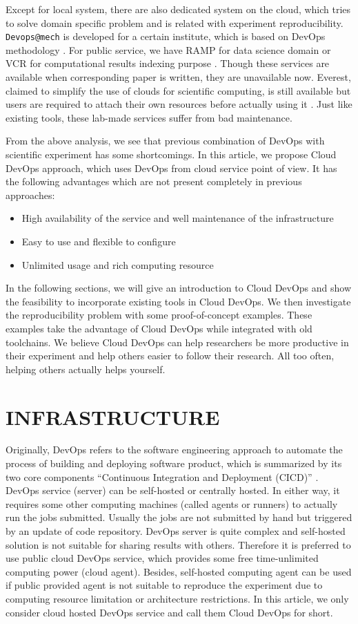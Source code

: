 \documentclass[10pt, conference, compsocconf]{IEEEtran}
\begin{document}
Except for local system, there are also dedicated system on the cloud, which tries to solve domain specific problem and is related with experiment reproducibility. \texttt{Devops@mech} is developed for a certain institute, which is based on DevOps methodology \cite{philips2019devops}. For public service, we have    RAMP for data science domain \cite{kegl2018ramp} or VCR for computational results indexing purpose \cite{GavishD12}. Though these services are available when corresponding paper is written, they are unavailable now.
Everest, claimed to simplify the use of clouds for scientific computing, is still available but users are required to attach their own resources before actually using it \cite{VOLKOV2017112}.
Just like existing tools, these lab-made services suffer from bad maintenance.

From the above analysis, we see that previous combination of DevOps with scientific experiment has some shortcomings. In this article, we propose Cloud DevOps approach, which uses DevOps from cloud service point of view. It has the following advantages which are not present completely in previous approaches:
\begin{itemize}
	\item High availability of the service and well maintenance of the infrastructure
	\item Easy to use and flexible to configure
	\item Unlimited usage and rich computing resource
\end{itemize}
 In the following sections, we will give an introduction to Cloud DevOps and show the feasibility to incorporate existing tools in Cloud DevOps. We then investigate the reproducibility problem with some proof-of-concept examples. These examples take the advantage of Cloud DevOps while integrated with old toolchains. We believe Cloud DevOps can help researchers be more productive in their experiment and help others easier to follow their research. All too often, helping others actually helps yourself.

\section{INFRASTRUCTURE}
Originally, DevOps refers to the software engineering approach to automate the process of building and deploying software product, which is summarized by its two core components ``Continuous Integration and Deployment (CICD)'' \cite{bass2015devops}. 
DevOps service (server) can be self-hosted or centrally hosted. In either way, it requires some other computing machines (called agents or runners) to actually run the jobs submitted. Usually the jobs are not submitted by hand but triggered by an update of code repository. 
DevOps server is quite complex and self-hosted solution is not suitable for sharing results with others. Therefore it is preferred to use public cloud DevOps service, which provides some free time-unlimited computing power (cloud agent). Besides, self-hosted computing agent can be used if public provided agent is not suitable to reproduce the experiment due to computing resource limitation or architecture restrictions. In this article, we only consider cloud hosted DevOps service and call them Cloud DevOps for short.
\end{document}
